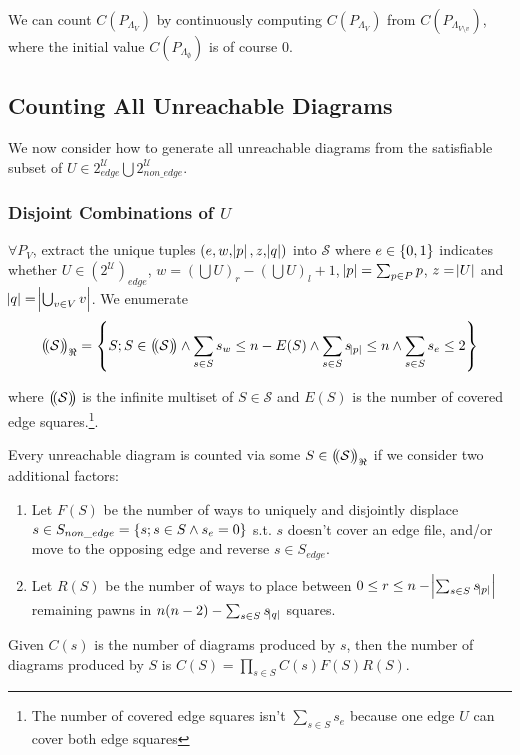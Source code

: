 \documentclass{amsart}
\def\multiset#1{\ensuremath{\left(\kern-.2em\left(#1\right)\kern-.2em\right)}}
\begin{document}
We can count $C(P_{\Lambda_V})$ by continuously computing $C(P_{\Lambda_V})$ from $C(P_{\Lambda_{V \setminus v}})$, where the initial value $C(P_{\Lambda_{\emptyset}})$ is of course $0$.

\subsection{Counting All Unreachable Diagrams} We now consider how to generate all unreachable diagrams from the satisfiable subset of $U \in 2^\mathcal{U}_{edge} \bigcup 2^\mathcal{U}_{non\_edge}$.

\subsubsection{Disjoint Combinations of $U$} $\forall P_V$, extract the unique tuples $(e, w, \abs{p}, z, \abs{q})$ into $\mathcal{S}$ where $e \in \set{0, 1}$ indicates whether $U \in (2^\mathcal{U})_{edge}$, $w = (\bigcup U)_r - (\bigcup U)_l + 1$, $\abs{p} = \sum_{p \in P}p$, $z = \abs{U}$ and $\abs{q} = \abs{\bigcup_{v \in V} v}$. We enumerate $$\multiset{\mathcal{S}}_\Re = \set{S ; S \in \multiset{\mathcal{S}} \land \sum_{s \in S} s_w \leq n - E(S) \land \sum_{s \in S} s_{\abs{p}} \leq n \land \sum_{s \in S} s_e \leq 2}$$

where $\multiset{\mathcal{S}}$ is the infinite multiset of $S \in \mathcal{S}$ and $E(S)$ is the number of covered edge squares.\footnote{The number of covered edge squares isn't $\sum_{s \in S} s_e$ because one edge $U$ can cover both edge squares}.

Every unreachable diagram is counted via some $S \in \multiset{\mathcal{S}}_\Re$ if we consider two additional factors:

\begin{enumerate}
	\item Let $F(S)$ be the number of ways to uniquely and disjointly displace $s \in S_{non\_edge} = \set{s ; s \in S \land s_e = 0}$ s.t$.$ $s$ doesn't cover an edge file, and/or move to the opposing edge and reverse $s \in S_{edge}$.
	\item Let $R(S)$ be the number of ways to place between $0 \leq r \leq n-\abs{\sum_{s \in S} s_{\abs{p}}}$ remaining pawns in $n(n-2) - \sum_{s \in S} s_{\abs{q}}$ squares.
\end{enumerate}

Given $C(s)$ is the number of diagrams produced by $s$, then the number of diagrams produced by $S$ is $C(S) = \prod_{s \in S}C(s)F(S)R(S)$.
\end{document}
